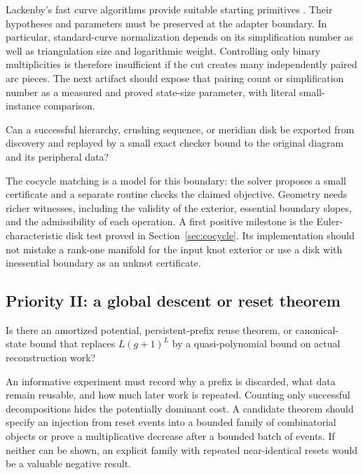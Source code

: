 Lackenby's fast curve algorithms provide suitable starting primitives
\cite{lackenbycurves2026}. Their hypotheses and parameters must be preserved
at the adapter boundary. In particular, standard-curve normalization depends
on its simplification number as well as triangulation size and logarithmic
weight. Controlling only binary multiplicities is therefore insufficient if
the cut creates many independently paired arc pieces. The next artifact
should expose that pairing count or simplification number as a measured and
proved state-size parameter, with literal small-instance comparison.

\begin{question}
Can a successful hierarchy, crushing sequence, or meridian disk be exported
from discovery and replayed by a small exact checker bound to the original
diagram and its peripheral data?
\end{question}

The cocycle matching is a model for this boundary: the solver proposes a
small certificate and a separate routine checks the claimed objective.
Geometry needs richer witnesses, including the validity of the exterior,
essential boundary slopes, and the admissibility of each operation. A first
positive milestone is the Euler-characteristic disk test proved in
Section~\ref{sec:cocycle}. Its implementation should not mistake a rank-one
manifold for the input knot exterior or use a disk with inessential boundary
as an unknot certificate.

\subsection{Priority II: a global descent or reset theorem}

\begin{question}
Is there an amortized potential, persistent-prefix reuse theorem, or
canonical-state bound that replaces $L(g+1)^L$ by a quasi-polynomial bound
on actual reconstruction work?
\end{question}

An informative experiment must record why a prefix is discarded, what data
remain reusable, and how much later work is repeated. Counting only successful
decompositions hides the potentially dominant cost. A candidate theorem
should specify an injection from reset events into a bounded family of
combinatorial objects or prove a multiplicative decrease after a bounded
batch of events. If neither can be shown, an explicit family with repeated
near-identical resets would be a valuable negative result.

